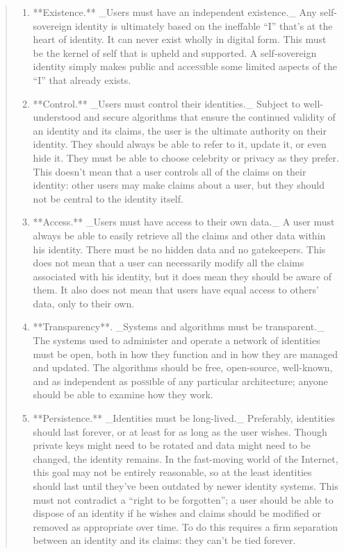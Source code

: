 \documentclass[twoside]{article}
\begin{document}
\begin{quote}
  \begin{enumerate}
    \item **Existence.** _Users must have an independent existence._ Any self-sovereign identity is ultimately based on the ineffable “I” that’s at the heart of identity. It can never exist wholly in digital form. This must be the kernel of self that is upheld and supported. A self-sovereign identity simply makes public and acce\textsc{ssi}ble some limited aspects of the “I” that already exists.
    \item **Control.** _Users must control their identities._ Subject to well-understood and secure algorithms that ensure the continued validity of an identity and its claims, the user is the ultimate authority on their identity. They should always be able to refer to it, update it, or even hide it. They must be able to choose celebrity or privacy as they prefer. This doesn’t mean that a user controls all of the claims on their identity: other users may make claims about a user, but they should not be central to the identity itself.
    \item **Access.** _Users must have access to their own data._ A user must always be able to easily retrieve all the claims and other data within his identity. There must be no hidden data and no gatekeepers. This does not mean that a user can necessarily modify all the claims associated with his identity, but it does mean they should be aware of them. It also does not mean that users have equal access to others’ data, only to their own.
    \item **Transparency**. _Systems and algorithms must be transparent._ The systems used to administer and operate a network of identities must be open, both in how they function and in how they are managed and updated. The algorithms should be free, open-source, well-known, and as independent as po\textsc{ssi}ble of any particular architecture; anyone should be able to examine how they work.
    \item **Persistence.** _Identities must be long-lived._ Preferably, identities should last forever, or at least for as long as the user wishes. Though private keys might need to be rotated and data might need to be changed, the identity remains. In the fast-moving world of the Internet, this goal may not be entirely reasonable, so at the least identities should last until they’ve been outdated by newer identity systems. This must not contradict a “right to be forgotten”; a user should be able to dispose of an identity if he wishes and claims should be modified or removed as appropriate over time. To do this requires a firm separation between an identity and its claims: they can’t be tied forever.

\end{enumerate}
\end{quote}
\end{document}
